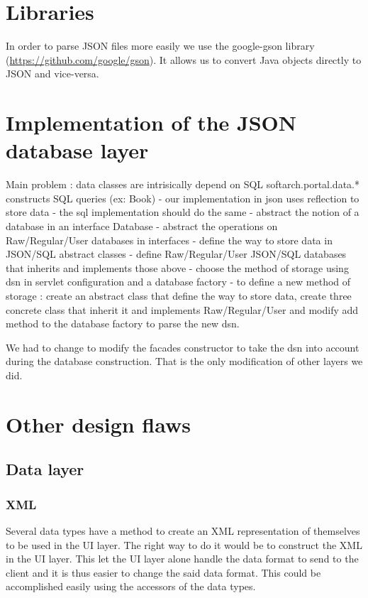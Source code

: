 \section{Libraries}

In order to parse JSON files more easily we use the google-gson library (\href{https://github.com/google/gson}{https://github.com/google/gson}). It allows us to convert Java objects directly to JSON and vice-versa.

\section{Implementation of the JSON database layer}

Main problem : data classes are intrisically depend on SQL softarch.portal.data.* constructs SQL queries (ex: Book) - our implementation in json uses reflection to store data - the sql implementation should do the same - abstract the notion of a database in an interface Database - abstract the operations on Raw/Regular/User databases in interfaces - define the way to store data in JSON/SQL abstract classes - define Raw/Regular/User JSON/SQL databases that inherits and implements those above - choose the method of storage using dsn in servlet configuration and a database factory - to define a new method of storage : create an abstract class that define the way to store data, create three concrete class that inherit it and implements Raw/Regular/User and modify add method to the database factory to parse the new dsn.

We had to change to modify the facades constructor to take the dsn into account during the database construction. That is the only modification of other layers we did.

\section{Other design flaws}

\subsection{Data layer}

\subsubsection{XML}
Several data types have a method to create an XML representation of themselves to be used in the UI layer. The right way to do it would be to construct the XML in the UI layer. This let the UI layer alone handle the data format to send to the client and it is thus easier to change the said data format. This could be accomplished easily using the accessors of the data types.

